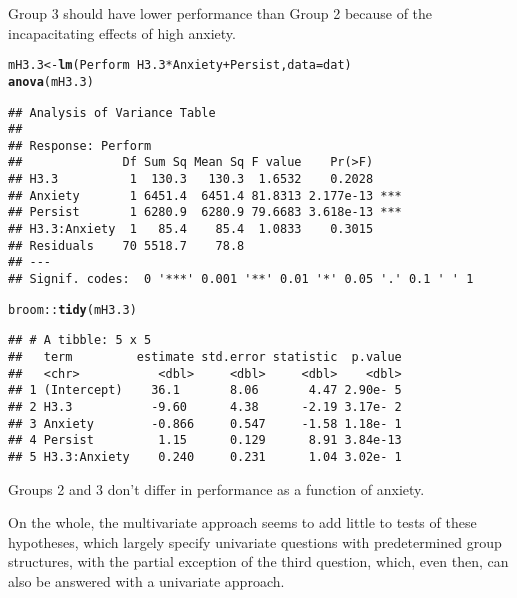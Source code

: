 \documentclass{article}\usepackage[]{graphicx}\usepackage[]{color}
\makeatletter
\newcommand{\hlopt}[1]{\textcolor[rgb]{0,0,0}{#1}}%
\newcommand{\hlstd}[1]{\textcolor[rgb]{0.345,0.345,0.345}{#1}}%
\newcommand{\hlkwb}[1]{\textcolor[rgb]{0.69,0.353,0.396}{#1}}%
\newcommand{\hlkwc}[1]{\textcolor[rgb]{0.333,0.667,0.333}{#1}}%
\newcommand{\hlkwd}[1]{\textcolor[rgb]{0.737,0.353,0.396}{\textbf{#1}}}%
\newenvironment{kframe}{%
 \def\at@end@of@kframe{}%
 \ifinner\ifhmode%
  \def\at@end@of@kframe{\end{minipage}}%
  \begin{minipage}{\columnwidth}%
 \fi\fi%
 \def\FrameCommand##1{\hskip\@totalleftmargin \hskip-\fboxsep
 \colorbox{shadecolor}{##1}\hskip-\fboxsep
     \hskip-\linewidth \hskip-\@totalleftmargin \hskip\columnwidth}%
 \MakeFramed {\advance\hsize-\width
   \@totalleftmargin\z@ \linewidth\hsize
   \@setminipage}}%
 {\par\unskip\endMakeFramed%
 \at@end@of@kframe}
\newenvironment{knitrout}{}{} %
\makeatother
\begin{document}
Group 3 should have lower performance than Group 2 because of the incapacitating effects of high anxiety.
\begin{knitrout}
\color{fgcolor}\begin{kframe}
\begin{alltt}
\hlstd{mH3.3} \hlkwb{<-} \hlkwd{lm}\hlstd{(Perform} \hlopt{~} \hlstd{H3.3}\hlopt{*}\hlstd{Anxiety} \hlopt{+} \hlstd{Persist,} \hlkwc{data} \hlstd{= dat)}
\hlkwd{anova}\hlstd{(mH3.3)}
\end{alltt}
\begin{verbatim}
## Analysis of Variance Table
## 
## Response: Perform
##              Df Sum Sq Mean Sq F value    Pr(>F)    
## H3.3          1  130.3   130.3  1.6532    0.2028    
## Anxiety       1 6451.4  6451.4 81.8313 2.177e-13 ***
## Persist       1 6280.9  6280.9 79.6683 3.618e-13 ***
## H3.3:Anxiety  1   85.4    85.4  1.0833    0.3015    
## Residuals    70 5518.7    78.8                      
## ---
## Signif. codes:  0 '***' 0.001 '**' 0.01 '*' 0.05 '.' 0.1 ' ' 1
\end{verbatim}
\begin{alltt}
\hlstd{broom}\hlopt{::}\hlkwd{tidy}\hlstd{(mH3.3)}
\end{alltt}
\begin{verbatim}
## # A tibble: 5 x 5
##   term         estimate std.error statistic  p.value
##   <chr>           <dbl>     <dbl>     <dbl>    <dbl>
## 1 (Intercept)    36.1       8.06       4.47 2.90e- 5
## 2 H3.3           -9.60      4.38      -2.19 3.17e- 2
## 3 Anxiety        -0.866     0.547     -1.58 1.18e- 1
## 4 Persist         1.15      0.129      8.91 3.84e-13
## 5 H3.3:Anxiety    0.240     0.231      1.04 3.02e- 1
\end{verbatim}
\end{kframe}
\end{knitrout}

Groups 2 and 3 don't differ in performance as a function of anxiety.

On the whole, the multivariate approach seems to add little to tests of these hypotheses, which largely specify univariate questions with predetermined group structures, with the partial exception of the third question, which, even then, can also be answered with a univariate approach. 
\end{document}
